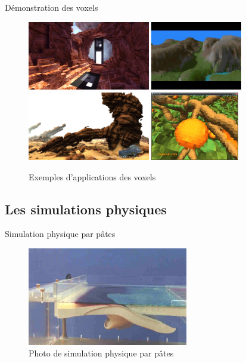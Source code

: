 \documentclass{beamer}
\begin{document}
\begin{frame}{Démonstration des voxels}
  \begin{center}
    \begin{figure}
      \includegraphics[height=3cm]{Images/Images_Alexis/voxel_engine3.jpg}
      \includegraphics[height=3cm]{Images/Images_Alexis/voxel_engine1.jpg} \\
      \includegraphics[height=3cm]{Images/Images_Alexis/voxel_engine4.jpg}
      \includegraphics[height=3cm]{Images/Images_Alexis/voxel_engine2.jpg}
      \caption{Exemples d'applications des voxels}
    \end{figure}
  \end{center}
\end{frame}

\subsection{Les simulations physiques}
\begin{frame}{Simulation physique par pâtes}
  \begin{center}
    \begin{figure}
      \includegraphics[width=7cm]{Images/simulation_physique.png}
      \caption{Photo de simulation physique par pâtes}
    \end{figure}
  \end{center}
\end{frame}
\end{document}
